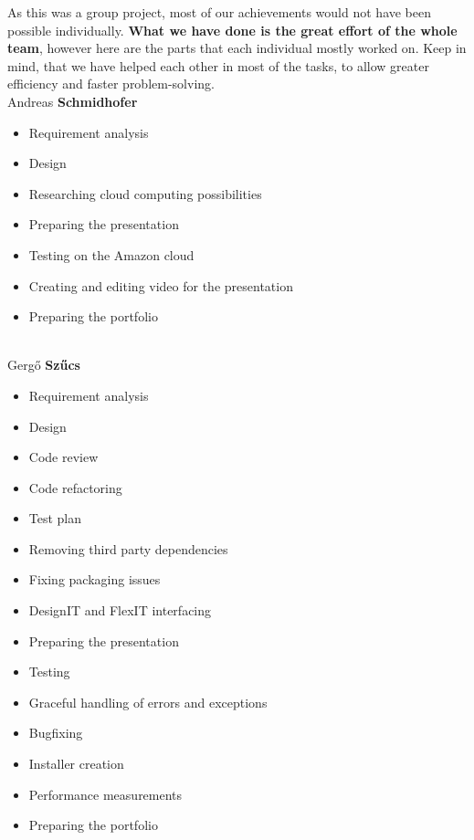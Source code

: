 \documentclass[a4paper, 11pt, article]{report}
\begin{document}
As this was a group project, most of our achievements would not have been possible individually. \textbf{What we have done is the great effort of the whole team}, however here are the parts that each individual mostly worked on. Keep in mind, that we have helped each other in most of the tasks, to allow greater efficiency and faster problem-solving. \\

\noindent Andreas \textbf{Schmidhofer} 
\begin{itemize}
	\item Requirement analysis
	\item Design
	\item Researching cloud computing possibilities
	\item Preparing the presentation
	\item Testing on the Amazon cloud
	\item Creating and editing video for the presentation
	\item Preparing the portfolio
\end{itemize} 

\noindent \\ Gergő \textbf{Szűcs}
\begin{itemize}
	\item Requirement analysis
	\item Design
	\item Code review
	\item Code refactoring
	\item Test plan
	\item Removing third party dependencies
	\item Fixing packaging issues
	\item DesignIT and FlexIT interfacing
	\item Preparing the presentation
	\item Testing 
	\item Graceful handling of errors and exceptions
	\item Bugfixing
	\item Installer creation
	\item Performance measurements
	\item Preparing the portfolio
\end{itemize}

\newpage
\end{document}
